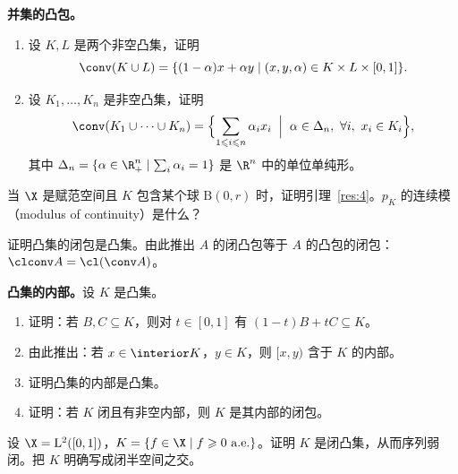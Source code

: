 
\begin{exercise}[原讲义 B.1 练习 1]
\label{exo:B1-1}
\textbf{并集的凸包。}
\begin{enumerate}[label=\arabic*.]
  \item 设 $K,L$ 是两个非空凸集，证明
  \[
    \conv(K\cup L)=\{(1-\alpha)x+\alpha y\mid(x,y,\alpha)\in K\times L\times[0,1]\}.
  \]
  \item 设 $K_1,\dots,K_n$ 是非空凸集，证明
  \[
    \conv(K_1\cup\dots\cup K_n)=\Bigl\{\sum_{1\leqslant i\leqslant n}\alpha_ix_i\;\Bigm|\;\alpha\in\Delta_n,\ \forall i,\ x_i\in K_i\Bigr\},
  \]
  其中 $\Delta_n=\{\alpha\in\R^n_+\mid\sum_i\alpha_i=1\}$ 是 $\R^n$ 中的单位单纯形。
\end{enumerate}
\end{exercise}

\begin{exercise}[原讲义 B.1 练习 2]
\label{exo:B1-2}
当 $\X$ 是赋范空间且 $K$ 包含某个球 $\mathrm B(0,r)$ 时，证明引理~\ref{res:4}。$p_K$ 的连续模（modulus of continuity）是什么？
\end{exercise}

\begin{exercise}[原讲义 B.1 练习 3]
\label{exo:B1-3}
证明凸集的闭包是凸集。由此推出 $A$ 的闭凸包等于 $A$ 的凸包的闭包：$\clconv A=\cl(\conv A)$。
\end{exercise}

\begin{exercise}[原讲义 B.1 练习 4]
\label{exo:B1-4}
\textbf{凸集的内部。}设 $K$ 是凸集。
\begin{enumerate}[label=\arabic*.]
  \item 证明：若 $B,C\subseteq K$，则对 $t\in[0,1]$ 有 $(1-t)B+tC\subseteq K$。
  \item 由此推出：若 $x\in\interior K$，$y\in K$，则 $[x,y)$ 含于 $K$ 的内部。
  \item 证明凸集的内部是凸集。
  \item 证明：若 $K$ 闭且有非空内部，则 $K$ 是其内部的闭包。
\end{enumerate}
\end{exercise}

\begin{exercise}[原讲义 B.1 练习 5]
\label{exo:B1-5}
设 $\X=\mathrm L^2([0,1])$，$K=\{f\in\X\mid f\geqslant0\ \text{a.e.}\}$。证明 $K$ 是闭凸集，从而序列弱闭。把 $K$ 明确写成闭半空间之交。
\end{exercise}

